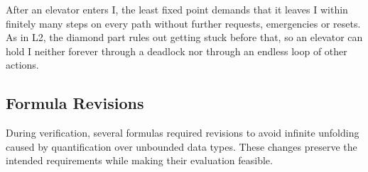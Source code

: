 After an elevator enters I, the least fixed point demands that it leaves I within finitely many steps on every path without further requests, emergencies or resets. As in L2, the diamond part rules out getting stuck before that, so an elevator can hold I neither forever through a deadlock nor through an endless loop of other actions.


\subsection{Formula Revisions}
\label{subsec:formula-revisions}

During verification, several formulas required revisions to avoid infinite unfolding caused by quantification over unbounded data types. These changes preserve the intended requirements while making their evaluation feasible.


